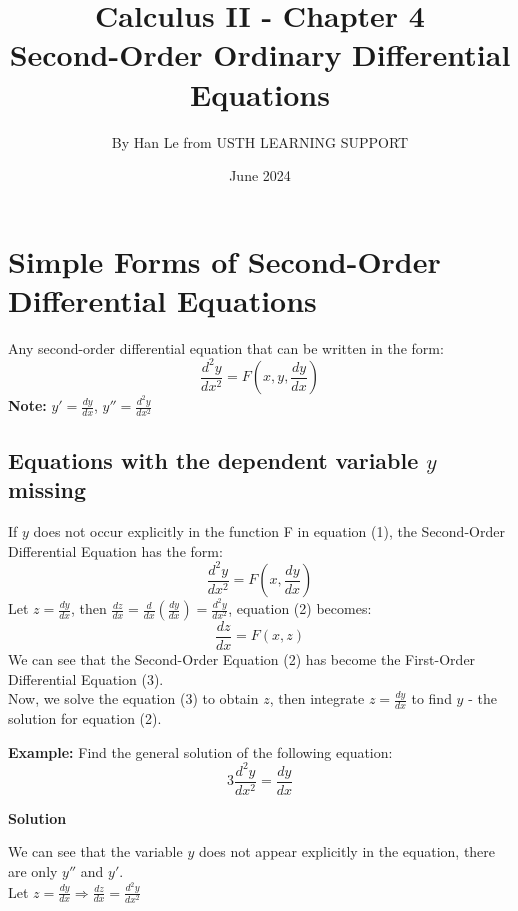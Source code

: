 \documentclass{article}
\title{Calculus II - Chapter 4\\Second-Order Ordinary Differential Equations}
\author{By Han Le from USTH LEARNING SUPPORT}
\date{June 2024}
\begin{document}
\maketitle
\tableofcontents
\newpage
\section{Simple Forms of Second-Order Differential Equations}
Any second-order differential equation that can be written in the form:
\begin{equation}
    \displaystyle\frac{d^2y}{dx^2}=F\left(x,y,\frac{dy}{dx}\right)
\end{equation}
\textbf{Note: }$y'=\displaystyle\frac{dy}{dx}$, $y''=\displaystyle\frac{d^2y}{dx^2}$
\subsection{Equations with the dependent variable $y$ missing}
\begin{mybox}
    If $y$ does not occur explicitly in the function F in equation (1), the Second-Order Differential Equation has the form:
    \begin{equation}
        \displaystyle\frac{d^2y}{dx^2}=F\left(x,\frac{dy}{dx}\right)
    \end{equation}
Let $z=\displaystyle\frac{dy}{dx}$, then $\displaystyle\frac{dz}{dx}=\frac{d}{dx}\left(\displaystyle\frac{dy}{dx}\right)=\frac{d^2y}{dx^2}$, equation (2) becomes:
    \begin{equation}
        \displaystyle\frac{dz}{dx}=F(x,z)
    \end{equation}
We can see that the Second-Order Equation (2) has become the First-Order Differential Equation (3).\\ 
Now, we solve the equation (3) to obtain $z$, then integrate $z=\displaystyle\frac{dy}{dx}$ to find $y$ - the solution for equation (2).
\end{mybox}
\textbf{Example:} Find the general solution of the following equation:
\begin{equation*}
    3\displaystyle\frac{d^2y}{dx^2}=\frac{dy}{dx}
\end{equation*}
\begin{center}
    \textbf{Solution}
\end{center}
We can see that the variable $y$ does not appear explicitly in the equation, there are only $y''$ and $y'$.\\
Let $z=\displaystyle\frac{dy}{dx} \Rightarrow \frac{dz}{dx}=\frac{d^2y}{dx^2}$\\
\end{document}
